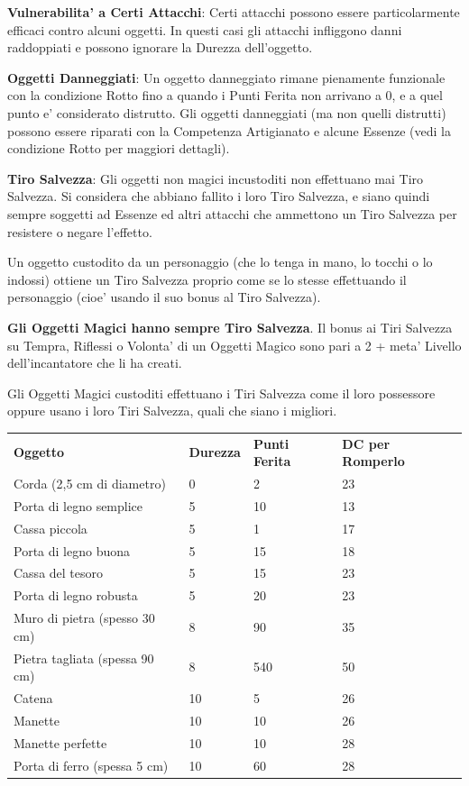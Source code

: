 \documentclass[a4paper,11pt,twoside,openany]{book}
\begin{document}
{\textbf{Vulnerabilita' a Certi Attacchi}: Certi attacchi possono essere particolarmente efficaci contro alcuni oggetti. In questi casi gli attacchi infliggono danni raddoppiati e possono ignorare la Durezza dell'oggetto.

\textbf{Oggetti Danneggiati}: Un oggetto danneggiato rimane pienamente funzionale con la condizione Rotto fino a quando i Punti Ferita non arrivano a 0, e a quel punto e' considerato distrutto. Gli oggetti danneggiati (ma non quelli distrutti) possono essere riparati con la Competenza Artigianato e alcune Essenze (vedi la condizione Rotto per maggiori dettagli).

\textbf{Tiro Salvezza}: Gli oggetti non magici incustoditi non effettuano mai Tiro Salvezza. Si considera che abbiano fallito i loro Tiro Salvezza, e siano quindi sempre soggetti ad Essenze ed altri attacchi che ammettono un Tiro Salvezza per resistere o negare l'effetto.

Un oggetto custodito da un personaggio (che lo tenga in mano, lo tocchi o lo indossi) ottiene un Tiro Salvezza proprio come se lo stesse effettuando il personaggio (cioe' usando il suo bonus al Tiro Salvezza).

\textbf{Gli Oggetti Magici hanno sempre Tiro Salvezza}. Il bonus ai Tiri Salvezza su Tempra, Riflessi o Volonta' di un Oggetti Magico sono pari a 2 + meta' Livello dell'incantatore che li ha creati.

Gli Oggetti Magici custoditi effettuano i Tiri Salvezza come il loro possessore oppure usano i loro Tiri Salvezza, quali che siano i migliori.

\bigskip

\begin{tabular}{L{6cm} L{3cm} L{3cm} L{3cm}}
\toprule
\textbf{Oggetto} & \textbf{Durezza} & \textbf{Punti Ferita} & \textbf{DC per Romperlo}\tabularnewline
Corda (2,5 cm di diametro) & 0 & 2 & 23\tabularnewline
Porta di legno semplice & 5 & 10 & 13\tabularnewline
Cassa piccola & 5 & 1 & 17\tabularnewline
Porta di legno buona & 5 & 15 & 18\tabularnewline
Cassa del tesoro & 5 & 15 & 23\tabularnewline
Porta di legno robusta & 5 & 20 & 23\tabularnewline
Muro di pietra (spesso 30 cm) & 8 & 90 & 35\tabularnewline
Pietra tagliata (spessa 90 cm) & 8 & 540 & 50\tabularnewline
Catena & 10 & 5 & 26\tabularnewline
Manette & 10 & 10 & 26\tabularnewline
Manette perfette & 10 & 10 & 28\tabularnewline
Porta di ferro (spessa 5 cm) & 10 & 60 & 28\tabularnewline
\end{tabular}

\bigskip

}
\end{document}
